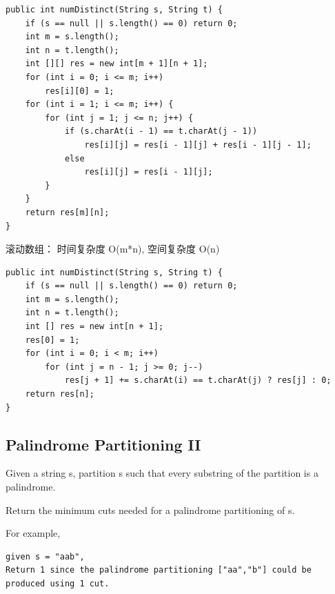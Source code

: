 \documentclass[12pt]{book}
\begin{document}
\lstset{language=java,label= ,caption= ,numbers=none}
\begin{lstlisting}
public int numDistinct(String s, String t) {
    if (s == null || s.length() == 0) return 0;
    int m = s.length();
    int n = t.length();
    int [][] res = new int[m + 1][n + 1];
    for (int i = 0; i <= m; i++) 
        res[i][0] = 1;
    for (int i = 1; i <= m; i++) {
        for (int j = 1; j <= n; j++) {
            if (s.charAt(i - 1) == t.charAt(j - 1))
                res[i][j] = res[i - 1][j] + res[i - 1][j - 1];
            else
                res[i][j] = res[i - 1][j];
        }
    }
    return res[m][n];
}
\end{lstlisting}

滚动数组： 时间复杂度 O(m*n), 空间复杂度 O(n)
\lstset{language=java,label= ,caption= ,numbers=none}
\begin{lstlisting}
public int numDistinct(String s, String t) {
    if (s == null || s.length() == 0) return 0;
    int m = s.length();
    int n = t.length();
    int [] res = new int[n + 1];
    res[0] = 1;
    for (int i = 0; i < m; i++) 
        for (int j = n - 1; j >= 0; j--) 
            res[j + 1] += s.charAt(i) == t.charAt(j) ? res[j] : 0;
    return res[n];
}
\end{lstlisting}

\subsection{Palindrome Partitioning II}
\label{sec-14-3-6}
Given a string s, partition s such that every substring of the partition is a palindrome.

Return the minimum cuts needed for a palindrome partitioning of s.

For example, 
\lstset{language=java,label= ,caption= ,numbers=none}
\begin{lstlisting}
given s = "aab",
Return 1 since the palindrome partitioning ["aa","b"] could be produced using 1 cut.
\end{lstlisting}
\end{document}
